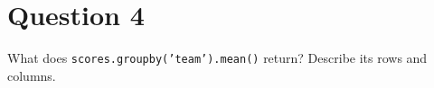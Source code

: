 \section*{Question 4}
What does \texttt{scores.groupby('team').mean()} return? Describe its rows and columns.
